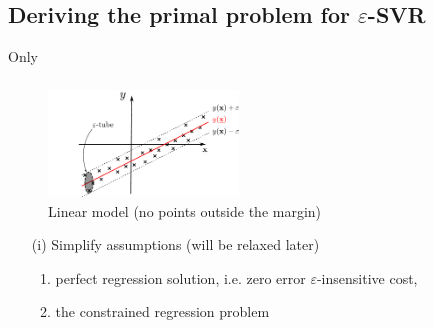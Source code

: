 \subsection{Deriving the primal problem for $\varepsilon$-SVR}

\begin{frame}{Only}\frametitle{\subsubsecname}

\begin{figure}[h]
     \centering
	 \includegraphics[width=0.45\textwidth]{img/regression_1d_linear_margin}%
     \caption{Linear model (no points outside the margin)}
	 \label{fig:model_margin}
\end{figure}

\slidesonly{\vspace{-5mm}}

\begin{itemize}
\item[(i)]
Simplify assumptions (will be relaxed later)

\begin{enumerate}
    \item<only@1-> perfect regression solution, i.e. zero error $\varepsilon$-insensitive cost,
    \item<only@2,3> the constrained regression problem\\
\end{enumerate}
\end{itemize}
\end{frame}
